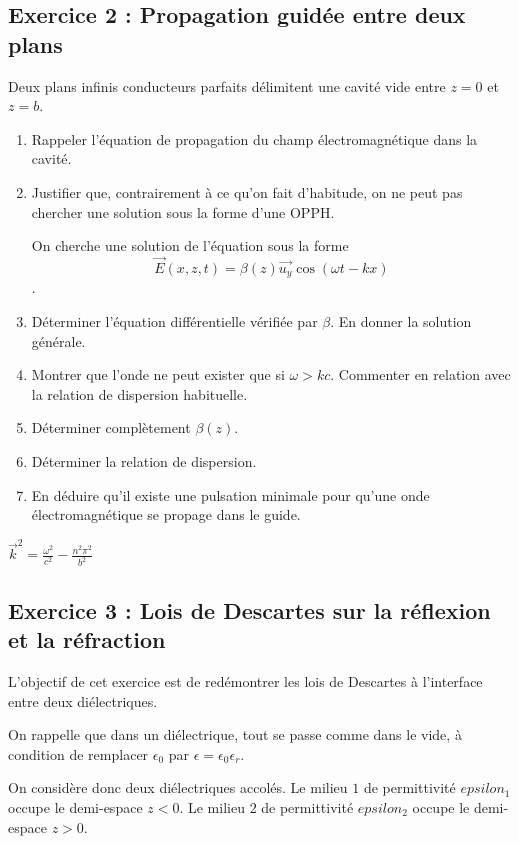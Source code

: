 \subsection{Exercice 2 : Propagation guidée entre deux plans}

Deux plans infinis conducteurs parfaits délimitent une cavité vide entre $z=0$ et $z=b$. 

\begin{enumerate}
	\item Rappeler l'équation de propagation du champ électromagnétique dans la cavité.
	\item Justifier que, contrairement à ce qu'on fait d'habitude, on ne peut pas chercher une solution sous la forme d'une OPPH.
	
	On cherche une solution de l'équation sous la forme $$\vec{E}(x, z, t) = \beta(z)\vec{u_y}\cos(\omega t - k x)$$.
	
	\item Déterminer l'équation différentielle vérifiée par $\beta$. En donner la solution générale.
	\item Montrer que l'onde ne peut exister que si $\omega > kc$. Commenter en relation avec la relation de dispersion habituelle.
	\item Déterminer complètement $\beta(z)$.
	\item Déterminer la relation de dispersion. 
	\item En déduire qu'il existe une pulsation minimale pour qu'une onde électromagnétique se propage dans le guide.
\end{enumerate}

 $\vec{k}^2 = \frac{\omega^2}{c^2} - \frac{n^2 \pi^2}{b^2}$

\subsection{Exercice 3 : Lois de Descartes sur la réflexion et la réfraction}

L'objectif de cet exercice est de redémontrer les lois de Descartes à l'interface entre deux diélectriques.

On rappelle que dans un diélectrique, tout se passe comme dans le vide, à condition de remplacer $\epsilon_0$ par $\epsilon = \epsilon_0 \epsilon_r$.

On considère donc deux diélectriques accolés. Le milieu $1$ de permittivité $epsilon_1$ occupe le demi-espace $z<0$. Le milieu $2$ de permittivité $epsilon_2$ occupe le demi-espace $z>0$.

